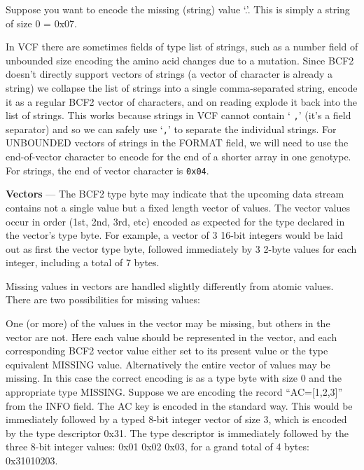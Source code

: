 \documentclass[8pt]{article}
\begin{document}
Suppose you want to encode the missing (string) value `.'.  This is simply a string of size 0 = 0x07.

\vspace{0.3cm}
In VCF there are sometimes fields of type list of strings, such as a number
field of unbounded size encoding the amino acid changes due to a mutation.
Since BCF2 doesn't directly support vectors of strings (a vector of character
is already a string) we collapse the list of strings into a single
comma-separated string, encode it as a regular BCF2 vector of characters, and
on reading explode it back into the list of strings.  This works because
strings in VCF cannot contain `{ \tt ,}' (it's a field separator) and so we can
safely use `{\tt ,}' to separate the individual strings. 
For UNBOUNDED vectors of strings in the FORMAT field, we will need to use the 
end-of-vector character to encode for the end of a shorter array in one genotype. 
For strings, the end of vector character is {\tt 0x04}.

%
%

\vspace{0.3cm}

\textbf{Vectors} --- The BCF2 type byte may indicate that the upcoming data stream contains not a single value but a fixed length vector of values.  The vector values occur in order (1st, 2nd, 3rd, etc) encoded as expected for the type declared in the vector's type byte.  For example, a vector of 3 16-bit integers would be laid out as first the vector type byte, followed immediately by 3 2-byte values for each integer, including a total of 7 bytes.

Missing values in vectors are handled slightly differently from atomic values.  There are two possibilities for missing values:

One (or more) of the values in the vector may be missing, but others in the vector are not.  Here each value should be represented in the vector, and each corresponding BCF2 vector value either set to its present value or the type equivalent MISSING value.
Alternatively the entire vector of values may be missing.  In this case the correct encoding is as a type byte with size 0 and the appropriate type MISSING.
Suppose we are encoding the record ``AC=[1,2,3]'' from the INFO field.  The AC key is encoded in the standard way.  This would be immediately followed by a typed 8-bit integer vector of size 3, which is encoded by the type descriptor 0x31.  The type descriptor is immediately followed by the three 8-bit integer values: 0x01 0x02 0x03, for a grand total of 4 bytes: 0x31010203.
\end{document}
